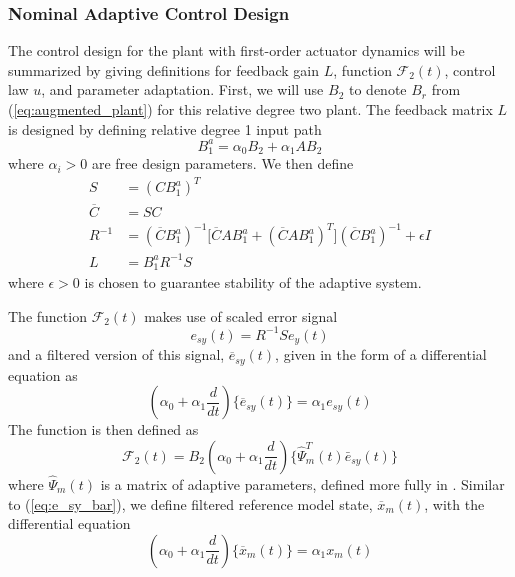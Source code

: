 \documentclass[english]{ifacconf}
\begin{document}
\subsubsection{Nominal Adaptive Control Design}
The control design for the plant with first-order actuator dynamics will be summarized by giving definitions for feedback gain $L$, function $\mathcal{F}_2(t)$, control law $u$, and parameter adaptation. First, we will use $B_2$ to denote $B_r$ from (\ref{eq:augmented_plant}) for this relative degree two plant. The feedback matrix $L$ is designed by defining relative degree 1 input path
\begin{equation}
B_1^a = \alpha_0 B_2 + \alpha_1 A B_2 \label{eq:rd2-b1a}
\end{equation}
where $\alpha_i > 0$ are free design parameters. We then define
\begin{align}
S &= (C B_1^a)^T \label{eq:S}\\	\overline{C} & = S C\\ R^{-1} &= (\overline{C} B_1^a)^{-1} \big[ \overline{C} A B_1^a + (\overline{C} A B_1^a)^T\big] (\overline{C} B_1^a)^{-1} + \epsilon I \\ L & = B_1^a R^{-1} S \label{eq:L}
\end{align}
where $\epsilon > 0$ \cite[Eq. 30]{qu2015adaptive} is chosen to guarantee stability of the adaptive system. 

The function $\mathcal{F}_2(t)$ makes use of scaled error signal
\begin{equation}
	e_{sy}(t) = R^{-1} S e_y(t) \label{eq:esy}
\end{equation}
and a filtered version of this signal, $\overline{e}_{sy}(t)$, given in the form of a differential equation as
\begin{equation}
(\alpha_0 + \alpha_1 \frac{d}{dt}) \big\{ \overline{e}_{sy}(t) \big\} = \alpha_1 e_{sy}(t) \label{eq:e_sy_bar}
\end{equation}
The function is then defined as
\begin{equation}
\mathcal{F}_2(t) = B_2 (\alpha_0 + \alpha_1 \frac{d}{dt})\big\{ \hat{\Psi}_m^T (t) \bar{e}_{sy}(t) \big\}
\end{equation}
where $\hat{\Psi}_m(t)$ is a matrix of adaptive parameters, defined more fully in \cite{qu2016adaptive}. Similar to (\ref{eq:e_sy_bar}), we define filtered reference model state, $\overline{x}_m(t)$, with the differential equation
\begin{equation}
(\alpha_0 + \alpha_1 \frac{d}{dt}) \big\{ \overline{x}_{m}(t) \big\} = \alpha_1 x_{m}(t) \label{eq:xm_bar}
\end{equation}
\end{document}

